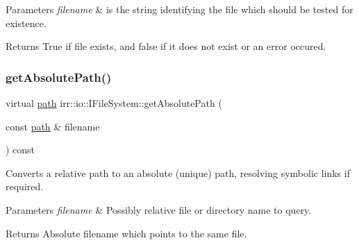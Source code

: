 \begin{DoxyParams}{Parameters}
{\em filename} & is the string identifying the file which should be tested for existence. \\
\hline
\end{DoxyParams}
\begin{DoxyReturn}{Returns}
True if file exists, and false if it does not exist or an error occured. 
\end{DoxyReturn}
\mbox{\label{classirr_1_1io_1_1IFileSystem_a77191d7917349a0200f5de3ef29acd18}} 
\subsubsection{\texorpdfstring{get\+Absolute\+Path()}{getAbsolutePath()}\hspace{0.1cm}{\footnotesize\ttfamily [1/2]}}
{\footnotesize\ttfamily virtual \hyperlink{namespaceirr_1_1io_a6468281622ce3a1c46b72e19f32dded5}{path} irr\+::io\+::\+I\+File\+System\+::get\+Absolute\+Path (\begin{DoxyParamCaption}\item[{const \hyperlink{namespaceirr_1_1io_a6468281622ce3a1c46b72e19f32dded5}{path} \&}]{filename }\end{DoxyParamCaption}) const\hspace{0.3cm}{\ttfamily [pure virtual]}}



Converts a relative path to an absolute (unique) path, resolving symbolic links if required. 


\begin{DoxyParams}{Parameters}
{\em filename} & Possibly relative file or directory name to query. \\
\hline
\end{DoxyParams}
\begin{DoxyReturn}{Returns}
Absolute filename which points to the same file. 
\end{DoxyReturn}
\mbox{\label{classirr_1_1io_1_1IFileSystem_a77191d7917349a0200f5de3ef29acd18}} 

